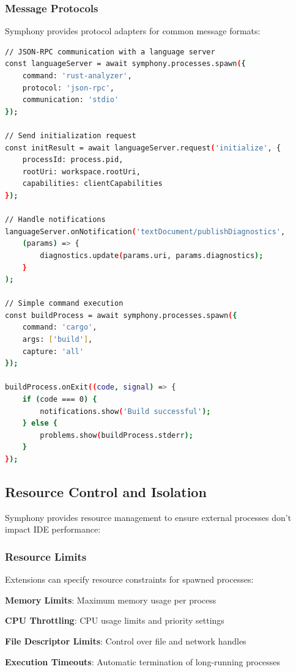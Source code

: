 \subsubsection*{Message Protocols}

Symphony provides protocol adapters for common message formats:

\begin{lstlisting}[language=bash, caption=Protocol Communication Example]
// JSON-RPC communication with a language server
const languageServer = await symphony.processes.spawn({
    command: 'rust-analyzer',
    protocol: 'json-rpc',
    communication: 'stdio'
});

// Send initialization request
const initResult = await languageServer.request('initialize', {
    processId: process.pid,
    rootUri: workspace.rootUri,
    capabilities: clientCapabilities
});

// Handle notifications
languageServer.onNotification('textDocument/publishDiagnostics', 
    (params) => {
        diagnostics.update(params.uri, params.diagnostics);
    }
);

// Simple command execution
const buildProcess = await symphony.processes.spawn({
    command: 'cargo',
    args: ['build'],
    capture: 'all'
});

buildProcess.onExit((code, signal) => {
    if (code === 0) {
        notifications.show('Build successful');
    } else {
        problems.show(buildProcess.stderr);
    }
});
\end{lstlisting}

\subsection*{Resource Control and Isolation}

Symphony provides resource management to ensure external processes don't impact IDE performance:

\subsubsection*{Resource Limits}

Extensions can specify resource constraints for spawned processes:

\begin{compactlist}
    \item \textbf{Memory Limits}: Maximum memory usage per process
    \item \textbf{CPU Throttling}: CPU usage limits and priority settings
    \item \textbf{File Descriptor Limits}: Control over file and network handles
    \item \textbf{Execution Timeouts}: Automatic termination of long-running processes
\end{compactlist}

